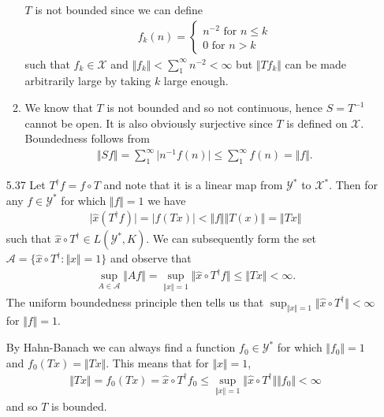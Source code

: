 \documentclass[11pt,letter]{article}
\begin{document}
\begin{enumerate}
\begin{enumerate}
    $T$ is not bounded since we can define
    \begin{align*}
        f_k(n) = \begin{cases} n^{-2} \text{ for } n \le k \\ 0 \text{ for } n > k \end{cases}
    \end{align*}
    such that $f_k \in \mathcal{X}$ and $\Vert f_k \Vert < \sum_1^\infty n^{-2} < \infty$ but $\Vert Tf_k \Vert$ can be made arbitrarily large by taking $k$ large enough.

    \item We know that $T$ is not bounded and so not continuous, hence $S = T^{-1}$ cannot be open. It is also obviously surjective since $T$ is defined on $\mathcal{X}$. Boundedness follows from
    \begin{align*}
        \Vert Sf \Vert = \sum_1^\infty \vert n^{-1}f(n) \vert \le \sum_1^\infty f(n) = \Vert f \Vert.
    \end{align*}
\end{enumerate}

\item [5.37] Let $T^\dagger f = f \circ T$ and note that it is a linear map from $\mathcal{Y}^*$ to $\mathcal{X}^*$. Then for any $f \in \mathcal{Y}^*$ for which $\Vert f \Vert = 1$ we have
\begin{align*}
    \vert \widehat x(T^\dagger f) \vert = \vert f(Tx) \vert < \Vert f \Vert \Vert T(x) \Vert = \Vert Tx \Vert
\end{align*}
such that $\widehat x \circ T^\dagger \in L(\mathcal{Y}^*, K)$. We can subsequently form the set $\mathcal{A} = \{\widehat x \circ T^\dagger: \Vert x \Vert = 1\}$ and observe that 
\begin{align*}
    \sup_{A \in \mathcal{A}} \Vert Af \Vert = \sup_{\Vert x \Vert = 1} \Vert \widehat x \circ T^\dagger f \Vert \le \Vert Tx \Vert < \infty.
\end{align*}
The uniform boundedness principle then tells us that $\sup_{\Vert x \Vert = 1} \Vert \widehat x \circ T^\dagger \Vert < \infty$ for $\Vert f \Vert = 1$.

By Hahn-Banach we can always find a function $f_0 \in \mathcal{Y}^*$ for which $\Vert f_0 \Vert = 1$ and $f_0(Tx) = \Vert Tx \Vert$. This means that for $\Vert x \Vert = 1$,
\begin{align*}
    \Vert Tx \Vert = f_0(Tx) = \widehat x \circ T^\dagger f_0 \le \sup_{\Vert x \Vert = 1} \Vert \widehat x \circ T^\dagger \Vert \Vert f_0 \Vert < \infty
\end{align*}
and so $T$ is bounded.


\end{enumerate}
\end{document}
